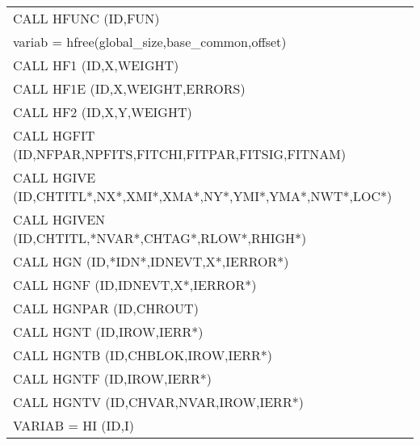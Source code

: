 \begin{longtable}{|>{\ttfamily\small}p{.9\linewidth}r|}
CALL     HFUNC  (ID,FUN)                     
&                                                       \pageref{HFUNC}  \\
variab = hfree(global\_size,base\_common,offset)
&                                                       \pageref{hfree}  \\
CALL     HF1    (ID,X,WEIGHT)                
&                                                       \pageref{HF1}    \\
CALL     HF1E   (ID,X,WEIGHT,ERRORS)                
&                                                       \pageref{HF1E}   \\
CALL     HF2    (ID,X,Y,WEIGHT)              
&                                                       \pageref{HF2}    \\
CALL     HGFIT  (ID,NFPAR,NPFITS,FITCHI,FITPAR,FITSIG,FITNAM)
&                                                       \pageref{HGFIT}  \\
CALL     HGIVE  (ID,CHTITL*,NX*,XMI*,XMA*,NY*,YMI*,YMA*,NWT*,LOC*)
&                                                       \pageref{HGIVE}  \\
CALL     HGIVEN (ID,CHTITL,*NVAR*,CHTAG*,RLOW*,RHIGH*)
&                                                       \pageref{HGIVEN} \\
CALL     HGN    (ID,*IDN*,IDNEVT,X*,IERROR*)
&                                                       \pageref{HGN}    \\
CALL     HGNF   (ID,IDNEVT,X*,IERROR*)         
&                                                       \pageref{HGIVEN} \\
CALL     HGNPAR (ID,CHROUT)
&                                                       \pageref{HGNPAR} \\
CALL     HGNT   (ID,IROW,IERR*)            
&                                                       \pageref{HGNT}   \\
CALL     HGNTB  (ID,CHBLOK,IROW,IERR*)            
&                                                       \pageref{HGNTB}  \\
CALL     HGNTF  (ID,IROW,IERR*)            
&                                                       \pageref{HGNTF}  \\
CALL     HGNTV  (ID,CHVAR,NVAR,IROW,IERR*)            
&                                                       \pageref{HGNTV}  \\
VARIAB = HI    (ID,I)                        
&                                                       \pageref{HI}     \\

\end{longtable}
